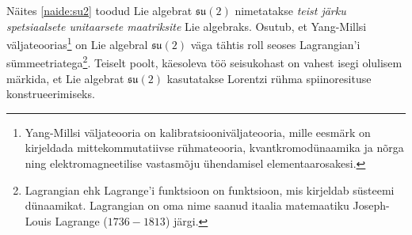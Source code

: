 \documentclass[12pt,a4paper,oneside]{article}
\theoremstyle{plain}
\theoremstyle{definition}
\numberwithin{equation}{section}
\def\su2{{\mathfrak{ su}\left(2\right)}}
\begin{document}
Näites \ref{naide:su2} toodud Lie algebrat $\su2$ nimetatakse 
\emph{teist järku spetsiaalsete unitaarsete maatriksite} Lie 
algebraks. Osutub, et Yang-Millsi väljateoorias\footnote{Yang-Millsi 
väljateooria on kalibratsiooniväljateooria, mille eesmärk on 
kirjeldada mittekommutatiivse rühmateooria, kvantkromodünaamika ja 
nõrga ning elektromagneetilise vastasmõju ühendamisel 
elementaarosakesi.} on Lie algebral $\su2$ väga tähtis roll seoses 
Lagrangian'i sümmeetriatega\footnote{Lagrangian ehk Lagrange'i 
funktsioon on funktsioon, mis kirjeldab süsteemi dünaamikat. 
Lagrangian on oma nime saanud itaalia matemaatiku Joseph-Louis 
Lagrange ($1736 - 1813$) järgi.}. Teiselt poolt, käesoleva töö 
seisukohast on vahest isegi olulisem märkida, et Lie algebrat $\su2$ 
kasutatakse Lorentzi rühma spiinoresituse konstrueerimiseks.
\end{document}
